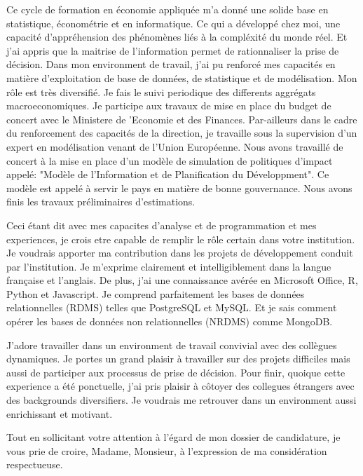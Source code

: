 \documentclass[12pt]{lettre}
\begin{document}
\begin{letter}
\begin{spacing}{1.5}
Ce cycle de formation en \'{e}conomie appliqu\'{e}e m'a donn\'{e} une solide
base en statistique, \'{e}conom\'{e}trie et en informatique. 
Ce qui a d\'{e}velopp\'{e} chez moi, une capacit\'{e} d'appr\'{e}hension 
des ph\'{e}nom\`{e}nes li\'{e}s \`{a} la compl\'{e}xit\'{e} du monde r\'{e}el.
Et j'ai appris que la maitrise de l'information permet de rationnaliser la prise de d\'{e}cision. 
Dans mon environment de travail, j'ai pu renforc\'{e} mes capacit\'{e}s 
en mati\`{e}re d'exploitation de base de donn\'{e}es, de statistique 
et de mod\'{e}lisation. Mon r\^{o}le est tr\`{e}s diversifi\'{e}. Je fais le suivi
periodique des differents aggr\'{e}gats macroeconomiques. Je participe aux travaux de
mise en place du budget de concert avec le Ministere de 'Economie et des Finances. 
Par-ailleurs dans le cadre du renforcement des capacit\'{e}s de la direction, 
je travaille sous la supervision d'un expert en mod\'{e}lisation
venant de l'Union Europ\'{e}enne. 
Nous avons travaill\'{e} de concert \`{a} 
la mise en place d'un mod\`{e}le de simulation de politiques d'impact 
appel\'{e}: "Mod\`{e}le de l'Information et de Planification du D\'{e}veloppment".
Ce mod\`{e}le est appel\'{e} \`{a} servir le pays en mati\`{e}re de bonne gouvernance. 
Nous avons finis les travaux pr\'{e}liminaires d'estimations.

Ceci \'{e}tant dit avec mes capacites d'analyse et de programmation et mes experiences,
je crois etre capable de remplir le r\^{o}le certain dans votre institution. Je voudrais apporter ma contribution dans les projets de 
d\'{e}veloppement conduit par l'institution. Je m'exprime clairement et intelligiblement 
dans la langue fran\c{c}aise et l'anglais. De plus, j'ai une connaissance av\'{e}r\'{e}e en Microsoft 
Office, R, Python et Javascript. Je comprend parfaitement les bases de donn\'{e}es 
relationnelles (RDMS) telles que PostgreSQL et MySQL. Et je sais comment op\'{e}rer les 
bases de donn\'{e}es non relationnelles (NRDMS) comme MongoDB.

J'adore travailler dans un environment de travail convivial avec des coll\`{e}gues dynamiques. Je portes 
un grand plaisir \`{a} travailler sur des projets difficiles mais aussi de participer aux processus de prise 
de d\'{e}cision. Pour finir, quoique cette experience a \'{e}t\'{e} ponctuelle, j'ai pris plaisir \`{a} c\^{o}toyer 
des collegues \'{e}trangers avec des backgrounds diversifiers. Je voudrais me retrouver dans un environment aussi enrichissant 
et motivant.

\end{spacing}

\closing{Tout en  sollicitant votre attention \`{a} l'\'{e}gard de mon dossier de candidature, 
je vous prie de croire, Madame, Monsieur, \`{a} l'expression de ma consid\'{e}ration respectueuse.}

\end{letter}
\end{document}
